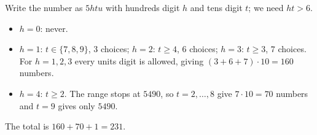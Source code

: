 Write the number as $5htu$ with hundreds digit $h$ and tens digit $t$; we need $ht>6$.
\begin{itemize}
\item $h=0$: never.
\item $h=1$: $t\in\{7,8,9\}$, $3$ choices; $h=2$: $t\ge4$, $6$ choices; $h=3$: $t\ge3$, $7$ choices. For $h=1,2,3$ every units digit is allowed, giving $(3+6+7)\cdot10=160$ numbers.
\item $h=4$: $t\ge2$. The range stops at $5490$, so $t=2,\dots,8$ give $7\cdot10=70$ numbers and $t=9$ gives only $5490$.
\end{itemize}
The total is $160+70+1=\boxed{231}$.
